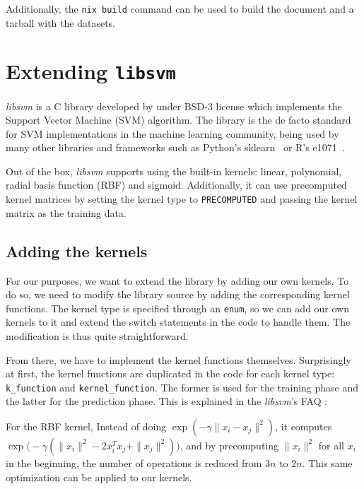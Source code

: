 Additionally, the \texttt{nix build} command can be used to build the
document and a tarball with the datasets.

\section{Extending \texttt{libsvm}}%
\label{sub:impl_c}

\emph{libsvm} is a C library developed by \textcite{CC01a} under BSD-3 license
which implements the Support Vector Machine (SVM) algorithm. The library is the
de facto standard for SVM implementations in the machine learning community,
being used by many other libraries and frameworks such as Python's
sklearn~\cite{ScikitlearnScikitlearn2023} or R's
e1071~\cite{meyer[autE1071MiscFunctions2023}.

Out of the box, \emph{libsvm} supports using the built-in kernels: linear,
polynomial, radial basis function (RBF) and sigmoid. Additionally, it can use
precomputed kernel matrices by setting the kernel type to \texttt{PRECOMPUTED}
and passing the kernel matrix as the training data.

\subsection{Adding the kernels}

For our purposes, we want to extend the library by adding our own kernels. To do
so, we need to modify the library source by adding the corresponding kernel
functions. The kernel type is specified through an \texttt{enum}, so we can add
our own kernels to it and extend the switch statements in the code to handle
them. The modification is thus quite straightforward.
\cite{arquemartinezDissenyImplementacioEstudi2021}

From there, we have to implement the kernel functions themselves. Surprisingly
at first, the kernel functions are duplicated in the code for each kernel type:
\texttt{k\_function} and \texttt{kernel\_function}. The former is used for the
training phase and the latter for the prediction phase. This is explained in the
\emph{libsvm}'s FAQ \cite{LIBSVMFAQ}:

For the RBF kernel, Instead of doing $\exp\left(-\gamma\|x_i - x_j\|^2\right)$,
it computes $\exp\bigl(-\gamma(\|x_i\|^2 - 2x_i^Tx_j + \|x_j\|^2)\bigr)$, and by
precomputing $\|x_i\|^2$ for all $x_i$ in the beginning, the number of
operations is reduced from $3n$ to $2n$. This same optimization can be applied
to our kernels.

